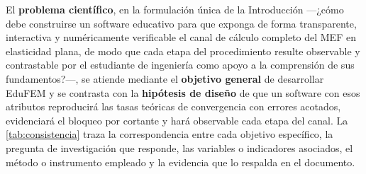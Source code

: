 El \textbf{problema científico}, en la formulación única de la Introducción —¿cómo debe construirse un software educativo para que exponga de forma transparente, interactiva y numéricamente verificable el canal de cálculo completo del MEF en elasticidad plana, de modo que cada etapa del procedimiento resulte observable y contrastable por el estudiante de ingeniería como apoyo a la comprensión de sus fundamentos?—, se atiende mediante el \textbf{objetivo general} de desarrollar EduFEM y se contrasta con la \textbf{hipótesis de diseño} de que un software con esos atributos reproducirá las tasas teóricas de convergencia con errores acotados, evidenciará el bloqueo por cortante y hará observable cada etapa del canal. La \autoref{tab:consistencia} traza la correspondencia entre cada objetivo específico, la pregunta de investigación que responde, las variables o indicadores asociados, el método o instrumento empleado y la evidencia que lo respalda en el documento.

